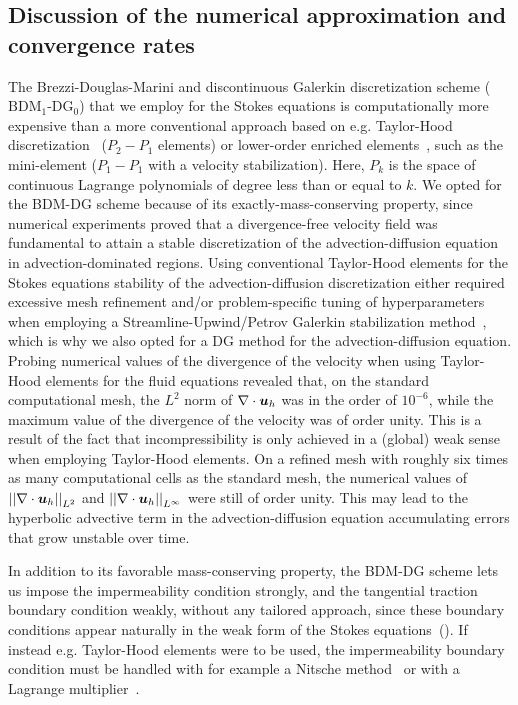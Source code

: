 \documentclass{WileyMSP-template}
\begin{document}
\subsection{Discussion of the numerical approximation and convergence rates}
The Brezzi-Douglas-Marini and discontinuous Galerkin discretization scheme
($\mathrm{BDM}_1$-$\mathrm{DG}_0$) that we employ for the Stokes equations
is computationally more expensive than a more conventional approach based on
e.g. Taylor-Hood discretization~\cite{Stenberg1990ErrorProblem}
($P_2-P_1$ elements) or lower-order enriched
elements~\cite{Brezzi2011MixedMethods},
such as the mini-element ($P_1-P_1$ with a velocity stabilization).
Here, $P_k$ is the space of continuous Lagrange polynomials of degree less
than or equal to $k$.
We opted for the BDM-DG scheme because of its exactly-mass-conserving property,
since numerical experiments proved that a divergence-free velocity field was
fundamental to attain a stable discretization of the advection-diffusion equation
in advection-dominated regions. Using conventional
Taylor-Hood elements for the Stokes equations
stability of the advection-diffusion discretization either
required excessive mesh refinement and/or problem-specific tuning of
hyperparameters when employing a Streamline-Upwind/Petrov Galerkin stabilization
method~\cite{Franca1992StabilizedModel}, which is why we also opted for a DG method
for the advection-diffusion equation.
Probing numerical values of the divergence of
the velocity when using Taylor-Hood elements for the fluid equations revealed that,
on the standard computational mesh, the $L^2$ norm of $\nabla\cdot\bm{u}_h$ was
in the order of $10^{-6}$, while the
maximum value of the divergence of the velocity was of order unity. This is a result
of the fact that incompressibility is only achieved in a (global) weak sense when
employing Taylor-Hood elements. On a refined mesh with roughly six times as many
computational cells as the standard mesh, the numerical values of
${ \vert\vert\nabla\cdot\bm{u}_h\vert\vert}_{L^2}$ and ${\vert\vert\nabla\cdot\bm{u}_h\vert\vert}_{L^{\infty}}$ were still
of order unity. This may lead to the
hyperbolic advective term in the advection-diffusion equation accumulating errors
that grow unstable over time. 

In addition to its favorable mass-conserving property, the BDM-DG scheme
lets us impose the impermeability condition strongly, and the tangential
traction boundary condition weakly, without any tailored approach,
since these boundary conditions appear naturally in the weak form of the
Stokes equations~(). If instead e.g. Taylor-Hood
elements were to be used, the impermeability boundary condition must
be handled with for example a Nitsche method~\cite{Nitsche1971UberSind}
or with a Lagrange multiplier~\cite{Babuska1973TheMultipliers,
Bertoluzza2017BoundaryHemodynamics}.
\end{document}

